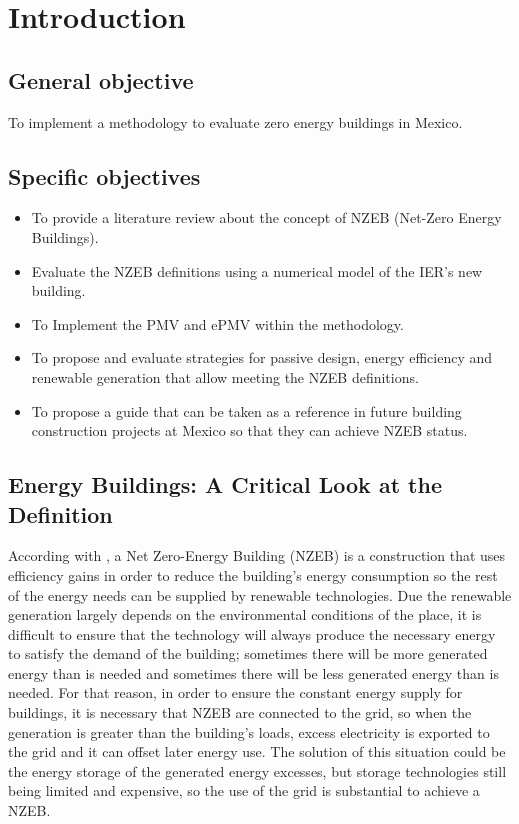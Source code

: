 \chapter{Introduction}
\label{chap:introduccion}

\section{General objective}

To implement a methodology to evaluate zero energy buildings in Mexico.


\section{Specific objectives}

\begin{itemize}

\item To provide a literature review about the concept of NZEB (Net-Zero Energy Buildings).

\item Evaluate the NZEB definitions using a numerical model of the IER's new building.

\item To Implement the PMV and ePMV within the methodology.

\item To propose and evaluate strategies for passive design, energy efficiency and renewable generation that allow meeting the NZEB definitions.

\item To propose a guide that can be taken as a reference in future building construction projects at Mexico  so that they can achieve NZEB status.

\end{itemize}



\section{Energy Buildings: A Critical Look at the Definition}

According with \citep{torcellini2006zero}, a Net Zero-Energy Building (NZEB) is a construction that uses efficiency gains in order to reduce the building's energy consumption so the rest of the energy needs can be supplied by renewable technologies. Due the renewable generation largely depends on the environmental conditions of the place, it is difficult to ensure that the technology will always produce the necessary energy to satisfy the demand of the building; sometimes there will be more generated energy than is needed and sometimes there will be less generated energy than is needed. For that reason, in order to ensure the constant energy supply for buildings, it is necessary that NZEB are connected to the grid, so when the generation is greater than the building's loads, excess electricity is exported to the grid and it can offset later energy use. The solution of this situation could be the energy storage of the generated energy excesses, but storage technologies still being limited and expensive, so the use of the grid is substantial to achieve a NZEB.

